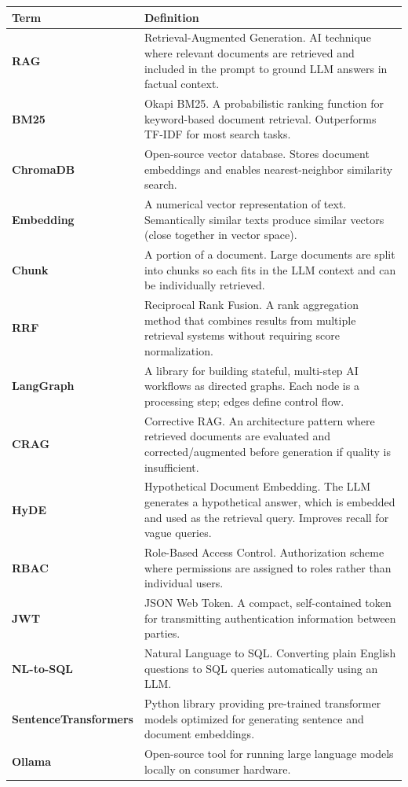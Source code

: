 \documentclass[12pt, a4paper, oneside]{report}
\begin{document}
\begin{longtable}{>{\bfseries}p{3.2cm}p{11.3cm}}
\toprule
\rowcolor{rapidblue!10}
\textbf{Term} & \textbf{Definition} \\
\midrule
\endhead
RAG & Retrieval-Augmented Generation. AI technique where relevant documents are retrieved and included in the prompt to ground LLM answers in factual context. \\
BM25 & Okapi BM25. A probabilistic ranking function for keyword-based document retrieval. Outperforms TF-IDF for most search tasks. \\
ChromaDB & Open-source vector database. Stores document embeddings and enables nearest-neighbor similarity search. \\
Embedding & A numerical vector representation of text. Semantically similar texts produce similar vectors (close together in vector space). \\
Chunk & A portion of a document. Large documents are split into chunks so each fits in the LLM context and can be individually retrieved. \\
RRF & Reciprocal Rank Fusion. A rank aggregation method that combines results from multiple retrieval systems without requiring score normalization. \\
LangGraph & A library for building stateful, multi-step AI workflows as directed graphs. Each node is a processing step; edges define control flow. \\
CRAG & Corrective RAG. An architecture pattern where retrieved documents are evaluated and corrected/augmented before generation if quality is insufficient. \\
HyDE & Hypothetical Document Embedding. The LLM generates a hypothetical answer, which is embedded and used as the retrieval query. Improves recall for vague queries. \\
RBAC & Role-Based Access Control. Authorization scheme where permissions are assigned to roles rather than individual users. \\
JWT & JSON Web Token. A compact, self-contained token for transmitting authentication information between parties. \\
NL-to-SQL & Natural Language to SQL. Converting plain English questions to SQL queries automatically using an LLM. \\
SentenceTransformers & Python library providing pre-trained transformer models optimized for generating sentence and document embeddings. \\
Ollama & Open-source tool for running large language models locally on consumer hardware. \\

\end{longtable}
\end{document}
